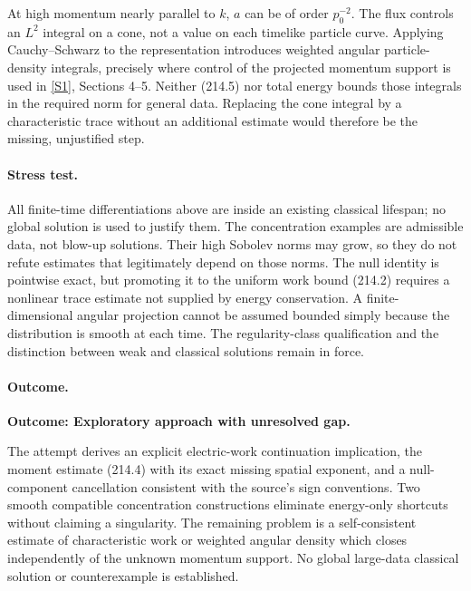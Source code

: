 \documentclass[11pt,a4paper]{article}
\newcommand{\sref}[2]{\hyperlink{source:#1:#2}{[S#2]}}
\begin{document}
At high momentum nearly parallel to $k$, $a$ can be of order $p_0^{-2}$.
The flux controls an $L^2$ integral on a cone, not a value on each timelike
particle curve. Applying Cauchy--Schwarz to the representation introduces
weighted angular particle-density integrals, precisely where control of the
projected momentum support is used in \sref{statement}{1}, Sections 4--5. Neither
(214.5) nor total energy bounds those integrals in the required norm for
general data. Replacing the cone integral by a characteristic trace without
an additional estimate would therefore be the missing, unjustified step.

\paragraph{Stress test.}
All finite-time differentiations above are inside an existing classical
lifespan; no global solution is used to justify them. The concentration
examples are admissible data, not blow-up solutions. Their high Sobolev
norms may grow, so they do not refute estimates that legitimately depend on
those norms. The null identity is pointwise exact, but promoting it to the
uniform work bound (214.2) requires a nonlinear trace estimate not supplied
by energy conservation. A finite-dimensional angular projection cannot be
assumed bounded simply because the distribution is smooth at each time.
The regularity-class qualification and the distinction between weak and
classical solutions remain in force.

\paragraph{Outcome.}
\textbf{Outcome: Exploratory approach with unresolved gap.}

The attempt derives an explicit electric-work continuation implication, the
moment estimate (214.4) with its exact missing spatial exponent, and a
null-component cancellation consistent with the source's sign conventions.
Two smooth compatible concentration constructions eliminate energy-only
shortcuts without claiming a singularity. The remaining problem is a
self-consistent estimate of characteristic work or weighted angular density
which closes independently of the unknown momentum support. No global
large-data classical solution or counterexample is established.
\end{document}
